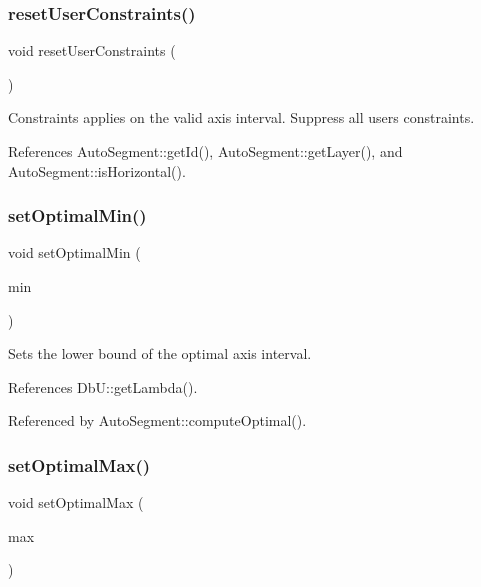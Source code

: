 \subsubsection{\texorpdfstring{reset\+User\+Constraints()}{resetUserConstraints()}}
{\footnotesize\ttfamily void reset\+User\+Constraints (\begin{DoxyParamCaption}{ }\end{DoxyParamCaption})\hspace{0.3cm}{\ttfamily [inline]}}

Constraints applies on the valid axis interval. Suppress all user\textquotesingle{}s constraints. 

References Auto\+Segment\+::get\+Id(), Auto\+Segment\+::get\+Layer(), and Auto\+Segment\+::is\+Horizontal().

\mbox{\label{classKatabatic_1_1AutoSegment_af92b3d000552b630695879dd5d4736a1}} 
\subsubsection{\texorpdfstring{set\+Optimal\+Min()}{setOptimalMin()}}
{\footnotesize\ttfamily void set\+Optimal\+Min (\begin{DoxyParamCaption}\item[{\textbf{ Db\+U\+::\+Unit}}]{min }\end{DoxyParamCaption})\hspace{0.3cm}{\ttfamily [inline]}}

Sets the lower bound of the optimal axis interval. 

References Db\+U\+::get\+Lambda().



Referenced by Auto\+Segment\+::compute\+Optimal().

\mbox{\label{classKatabatic_1_1AutoSegment_a90173ab4f35b98c6544f9482ccd93b5e}} 
\subsubsection{\texorpdfstring{set\+Optimal\+Max()}{setOptimalMax()}}
{\footnotesize\ttfamily void set\+Optimal\+Max (\begin{DoxyParamCaption}\item[{\textbf{ Db\+U\+::\+Unit}}]{max }\end{DoxyParamCaption})\hspace{0.3cm}{\ttfamily [inline]}}

